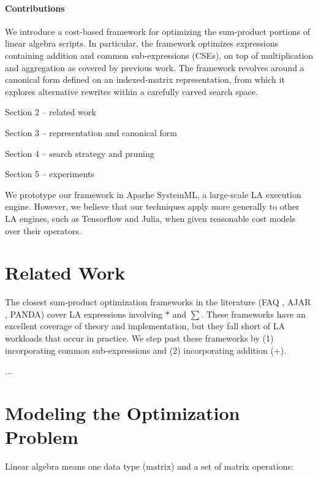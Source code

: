 
\paragraph{Contributions}
We introduce a cost-based framework for optimizing the sum-product portions of linear algebra scripts.  In particular, the framework optimizes expressions containing addition and common sub-expressions (CSEs), on top of multiplication and aggregation as covered by previous work.  The framework revolves around a canonical form defined on an indexed-matrix representation, from which it explores alternative rewrites within a carefully carved search space.  

Section 2 -- related work

Section 3 -- representation and canonical form

Section 4 -- search strategy and pruning

Section 5 -- experiments

We prototype our framework in Apache SystemML, a large-scale LA execution engine.  However, we believe that our techniques apply more generally to other LA engines, such as Tensorflow and Julia, when given reasonable cost models over their operators.




\section{Related Work}
The closest sum-product optimization frameworks in the literature (FAQ \cite{KhamisNR16}, AJAR \cite{Joglekar2016AJARAA}, PANDA) cover LA expressions involving $*$ and $\sum$.
These frameworks have an excellent coverage of theory and implementation,
but they fall short of LA workloads that occur in practice.
We step past these frameworks by (1) incorporating common sub-expressions and (2) incorporating addition ($+$).

...


\section{Modeling the Optimization Problem}

Linear algebra means one data type (matrix) and a set of matrix operations:


